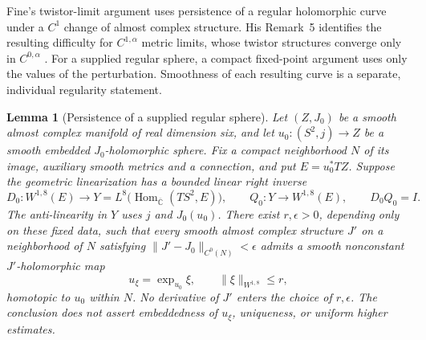 \documentclass[11pt]{article}
\numberwithin{equation}{section}
\newtheorem{lemma}[theorem]{Lemma}
\theoremstyle{definition}
\theoremstyle{remark}
\begin{document}
Fine's twistor-limit argument uses persistence of a regular holomorphic
curve under a $C^1$ change of almost complex structure. His
Remark~5 identifies the resulting difficulty for $C^{1,\alpha}$
metric limits, whose twistor structures converge only in
$C^{0,\alpha}$ \cite[Remark~5 and Proposition~7]{Fine2017TwistorLimits}.
For a supplied regular sphere, a compact fixed-point argument
uses only the values of the perturbation. Smoothness of each
resulting curve is a separate, individual regularity statement.

\begin{lemma}[Persistence of a supplied regular sphere]
\label{lem:c0-regular-sphere}
Let $(Z,J_0)$ be a smooth almost complex manifold of real dimension six,
and let $u_0:(S^2,j)\to Z$ be a smooth embedded $J_0$-holomorphic sphere.
Fix a compact neighborhood $N$ of its image, auxiliary smooth metrics
and a connection, and put $E=u_0^*TZ$. Suppose the geometric
linearization has a bounded linear right inverse
\[
 D_0:W^{1,8}(E)\longrightarrow
 Y=L^8\bigl(\operatorname{Hom}_{\overline{\mathbb C}}(TS^2,E)\bigr),
 \qquad Q_0:Y\longrightarrow W^{1,8}(E),\qquad D_0Q_0=I.
\]
The anti-linearity in $Y$ uses $j$ and $J_0(u_0)$.
There exist $r,\epsilon>0$, depending only on these fixed data,
such that every smooth almost complex structure $J'$ on a
neighborhood of $N$ satisfying
$\|J'-J_0\|_{C^0(N)}<\epsilon$ admits a smooth nonconstant
$J'$-holomorphic map
\[
 u_\xi=\exp_{u_0}\xi,\qquad \|\xi\|_{W^{1,8}}\le r,
\]
homotopic to $u_0$ within $N$. No derivative of $J'$ enters
the choice of $r,\epsilon$. The conclusion does not assert
embeddedness of $u_\xi$, uniqueness, or uniform higher estimates.
\end{lemma}
\end{document}
